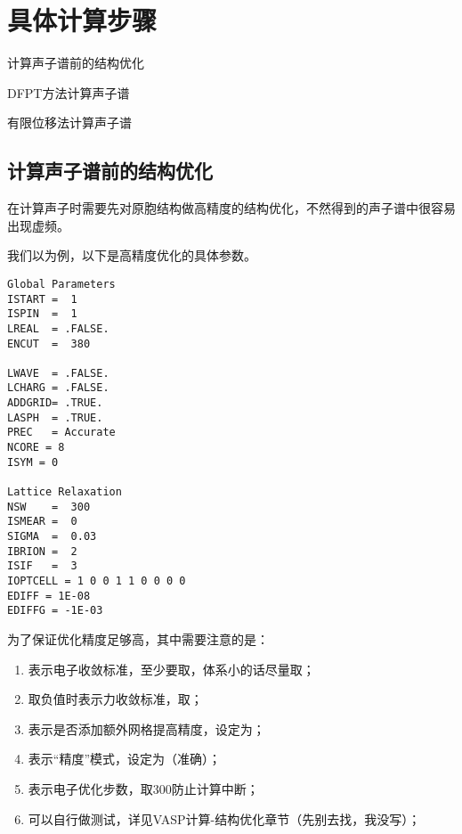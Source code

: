 \section{具体计算步骤}\label{sec:具体计算步骤}


\begin{Abstract}
    \item 计算声子谱前的结构优化
    \item DFPT方法计算声子谱
    \item 有限位移法计算声子谱
\end{Abstract}

\subsection{计算声子谱前的结构优化}\label{subsec:具体计算步骤-计算声子谱前的结构优化}

\begin{attention}
  在计算声子时需要先对原胞结构做高精度的结构优化，不然得到的声子谱中很容易出现虚频。  
\end{attention}

我们以为例，以下是高精度优化的具体参数。

\begin{lstlisting}[caption=INCAR]
Global Parameters
ISTART =  1
ISPIN  =  1
LREAL  = .FALSE.
ENCUT  =  380

LWAVE  = .FALSE.
LCHARG = .FALSE.
ADDGRID= .TRUE.
LASPH  = .TRUE.
PREC   = Accurate
NCORE = 8 
ISYM = 0

Lattice Relaxation
NSW    =  300
ISMEAR =  0
SIGMA  =  0.03
IBRION =  2
ISIF   =  3
IOPTCELL = 1 0 0 1 1 0 0 0 0
EDIFF = 1E-08
EDIFFG = -1E-03
\end{lstlisting}

为了保证优化精度足够高，其中需要注意的是：
\begin{enumerate}
    \item {}表示电子收敛标准，至少要取，体系小的话尽量取；
    \item {}取负值时表示力收敛标准，取；
    \item {}表示是否添加额外网格提高精度，设定为；
    \item {}表示“精度”模式，设定为（准确）；
    \item {}表示电子优化步数，取300防止计算中断；
    \item {}可以自行做测试，详见VASP计算-结构优化章节（先别去找，我没写）；
\end{enumerate}

